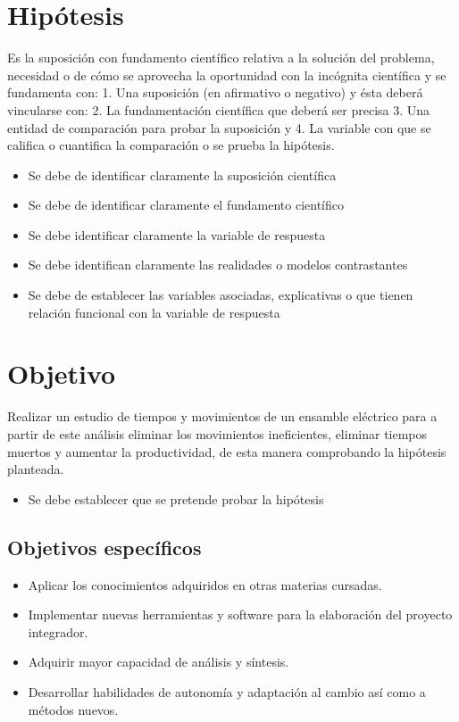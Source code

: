     \section{Hipótesis}
    
    Es la suposición con fundamento científico relativa a la solución del problema, necesidad o de cómo se aprovecha la oportunidad con la incógnita científica y se fundamenta con: 1. Una suposición (en afirmativo o negativo) y ésta deberá vincularse con:
    2. La fundamentación científica que deberá ser precisa 3. Una entidad de comparación para probar la suposición y
    4. La variable con que se califica o cuantifica la comparación o se prueba la hipótesis.
    
    \begin{itemize}
        \item Se debe de identificar claramente la suposición científica
        \item Se debe de identificar claramente el fundamento científico
        \item Se debe identificar claramente la variable de respuesta
        \item Se debe identifican claramente las realidades o modelos contrastantes
        \item Se debe de establecer las variables asociadas, explicativas o que tienen relación funcional con la variable de respuesta
    \end{itemize}
    \section{Objetivo}
    
    Realizar un estudio de tiempos y movimientos de un ensamble eléctrico para a partir de este análisis eliminar los movimientos ineficientes, eliminar tiempos muertos y aumentar la productividad, de esta manera comprobando la hipótesis planteada.
    \begin{itemize}
        \item Se debe establecer que se pretende probar la hipótesis
    \end{itemize}
    
    \subsection{Objetivos específicos }
    
    \begin{itemize}
        \item Aplicar los conocimientos adquiridos en otras materias cursadas.
        \item Implementar nuevas herramientas y software para la elaboración del proyecto integrador.
        \item  Adquirir mayor capacidad de análisis y síntesis.
        \item Desarrollar habilidades de autonomía y adaptación al cambio así como a métodos nuevos.
    \end{itemize}
    
